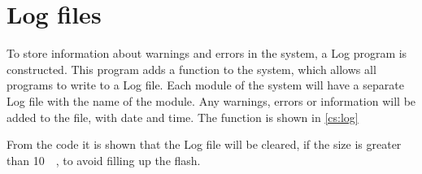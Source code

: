 \section{Log files}\label{sec:LOG}
To store information about warnings and errors in the system, a Log program is constructed. This program adds a function to the system, which allows all programs to write to a Log file. 
Each module of the system will have a separate Log file with the name of the module. Any warnings, errors or information will be added to the file, with date and time. The function is shown in \autoref{cs:log}

From the code it is shown that the Log file will be cleared, if the size is greater than \SI{10}{\mega\byte}, to avoid filling up the flash.

